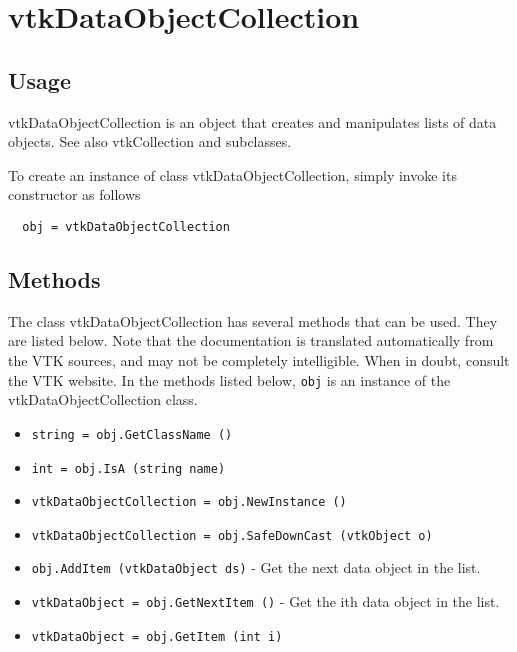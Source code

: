 \section{vtkDataObjectCollection}

\subsection{Usage}

 vtkDataObjectCollection is an object that creates and manipulates lists of
 data objects. See also vtkCollection and subclasses.

To create an instance of class vtkDataObjectCollection, simply
invoke its constructor as follows
\begin{verbatim}
  obj = vtkDataObjectCollection
\end{verbatim}
\subsection{Methods}

The class vtkDataObjectCollection has several methods that can be used.
  They are listed below.
Note that the documentation is translated automatically from the VTK sources,
and may not be completely intelligible.  When in doubt, consult the VTK website.
In the methods listed below, \verb|obj| is an instance of the vtkDataObjectCollection class.
\begin{itemize}
\item  \verb|string = obj.GetClassName ()|

\item  \verb|int = obj.IsA (string name)|

\item  \verb|vtkDataObjectCollection = obj.NewInstance ()|

\item  \verb|vtkDataObjectCollection = obj.SafeDownCast (vtkObject o)|

\item  \verb|obj.AddItem (vtkDataObject ds)| -  Get the next data object in the list.

\item  \verb|vtkDataObject = obj.GetNextItem ()| -  Get the ith data object in the list.

\item  \verb|vtkDataObject = obj.GetItem (int i)|

\end{itemize}

